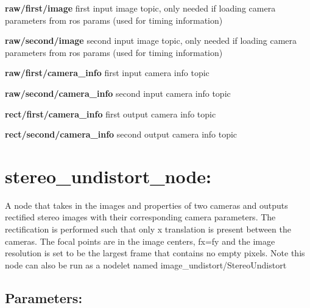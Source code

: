\begin{DoxyItemize}
\item {\bfseries raw/first/image} first input image topic, only needed if loading camera parameters from ros params (used for timing information)
\item {\bfseries raw/second/image} second input image topic, only needed if loading camera parameters from ros params (used for timing information)
\item {\bfseries raw/first/camera\+\_\+info} first input camera info topic
\item {\bfseries raw/second/camera\+\_\+info} second input camera info topic
\item {\bfseries rect/first/camera\+\_\+info} first output camera info topic
\item {\bfseries rect/second/camera\+\_\+info} second output camera info topic
\end{DoxyItemize}\hypertarget{md_vision_layer_image_undistort_README_autotoc_md103}{}\section{stereo\+\_\+undistort\+\_\+node\+:}\label{md_vision_layer_image_undistort_README_autotoc_md103}
A node that takes in the images and properties of two cameras and outputs rectified stereo images with their corresponding camera parameters. The rectification is performed such that only x translation is present between the cameras. The focal points are in the image centers, fx=fy and the image resolution is set to be the largest frame that contains no empty pixels. Note this node can also be run as a nodelet named image\+\_\+undistort/\+Stereo\+Undistort\hypertarget{md_vision_layer_image_undistort_README_autotoc_md104}{}\subsection{Parameters\+:}\label{md_vision_layer_image_undistort_README_autotoc_md104}

